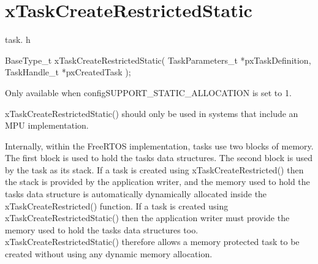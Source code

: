 \hypertarget{group__xTaskCreateRestrictedStatic}{}\section{x\+Task\+Create\+Restricted\+Static}
\label{group__xTaskCreateRestrictedStatic}
task. h 
\begin{DoxyPre}
 BaseType\_t xTaskCreateRestrictedStatic( TaskParameters\_t *pxTaskDefinition, TaskHandle\_t *pxCreatedTask );\end{DoxyPre}


Only available when config\+S\+U\+P\+P\+O\+R\+T\+\_\+\+S\+T\+A\+T\+I\+C\+\_\+\+A\+L\+L\+O\+C\+A\+T\+I\+ON is set to 1.

x\+Task\+Create\+Restricted\+Static() should only be used in systems that include an M\+PU implementation.

Internally, within the Free\+R\+T\+OS implementation, tasks use two blocks of memory. The first block is used to hold the task\textquotesingle{}s data structures. The second block is used by the task as its stack. If a task is created using x\+Task\+Create\+Restricted() then the stack is provided by the application writer, and the memory used to hold the task\textquotesingle{}s data structure is automatically dynamically allocated inside the x\+Task\+Create\+Restricted() function. If a task is created using x\+Task\+Create\+Restricted\+Static() then the application writer must provide the memory used to hold the task\textquotesingle{}s data structures too. x\+Task\+Create\+Restricted\+Static() therefore allows a memory protected task to be created without using any dynamic memory allocation.


